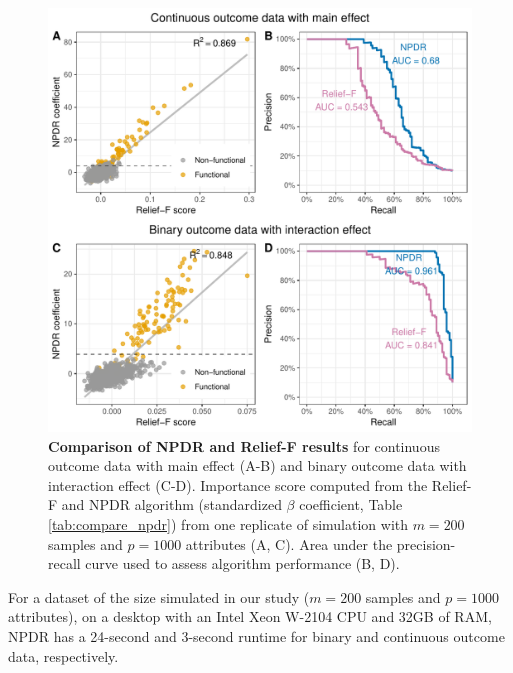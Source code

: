 \documentclass[10pt]{article}
\begin{document}
\begin{figure}[!tbp]
\centerline{\includegraphics[trim = 0 0 0 0]{../figs/fig1.pdf}}
\caption{{\bf Comparison of NPDR and Relief-F results} for continuous outcome data with main effect (A-B) and binary outcome data with interaction effect (C-D). Importance score computed from the Relief-F and NPDR algorithm (standardized $\beta$ coefficient, Table \ref{tab:compare_npdr}) from one replicate of simulation with $m = 200$ samples and $p = 1000$ attributes (A, C). Area under the precision-recall curve used to assess algorithm performance (B, D).}
\label{fig:npdr_relief}
\end{figure}

For a dataset of the size simulated in our study ($m=200$ samples and $p=1000$ attributes), on a desktop with an Intel Xeon W-2104 CPU and 32GB of RAM, NPDR has a 24-second and 3-second runtime for binary and continuous outcome data, respectively.

\end{document}
